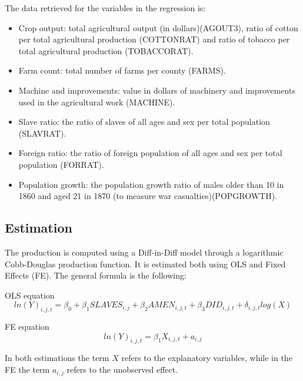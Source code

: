 \documentclass[11pt]{beamer}
\begin{document}
\begin{frame}[shrink]
The data retrieved for the variables in the regression is:
\begin{itemize}
\item Crop output: total agricultural output (in dollars)(AGOUT3), ratio of cotton per total agricultural production (COTTONRAT) and ratio of tobacco per total agricultural production (TOBACCORAT).
\item Farm count: total number of farms per county (FARMS).
\item Machine and improvements: value in dollars of machinery and improvements used in the agricultural work (MACHINE).
\item Slave ratio: the ratio of slaves of all ages and sex per total population (SLAVRAT).
\item Foreign ratio: the ratio of foreign population of all ages and sex per total population (FORRAT).
\item Population growth: the population growth ratio of males older than 10 in 1860 and aged 21 in 1870 (to measure war casualties)(POPGROWTH).
\end{itemize}

\end{frame}

\subsection{Estimation}
\begin{frame}
The production is computed using a Diff-in-Diff model through a logarithmic Cobb-Douglas production function. It is estimated both using OLS and Fixed Effects (FE). The general formula is the following:
\begin{block}{OLS equation}
\begin{equation}
ln(Y)_{i,j,t}=\beta_{0}+\beta_{1}SLAVES_{i,j}+\beta_{2}AMEN_{i,j,t}+\beta_{3}DID_{i,j,t}+\delta_{i,j,t}log(X)
\end{equation}
\end{block}
\begin{block}{FE equation}
\begin{equation}
ln(Y)_{i,j,t}=\beta_{1}X_{i,j,t} + a_{i,j}
\end{equation}
\end{block}
In both estimations the term $X$ refers to the explanatory variables, while in the FE the term $a_{i,j}$ refers to the unobserved effect.
\end{frame}
\end{document}
